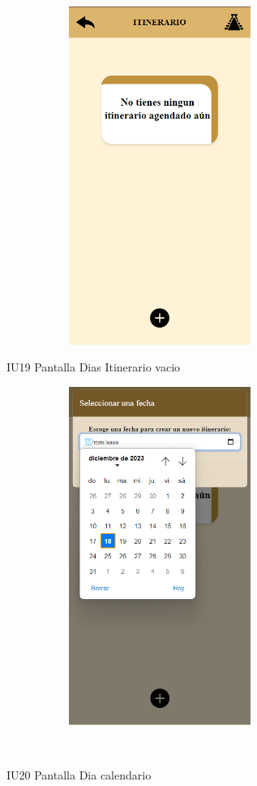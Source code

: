 \begin{figure}[htb]
    \begin{minipage}{1\textwidth}
    \centering
    \includegraphics[width=10cm, height=11cm]{entregable final/pantallasSistema/IU19 Pantalla Dias Itinerario vacio.png}
    \caption{IU19 Pantalla Dias Itinerario vacio}
\end{minipage}

    \begin{minipage}{1\textwidth}
        \centering
        \includegraphics[width=10cm, height=11cm]{entregable final/pantallasSistema/IU20 Pantalla Dia calendario.png}
        \caption{IU20 Pantalla Dia calendario}
    \end{minipage}
    \\
\end{figure}
